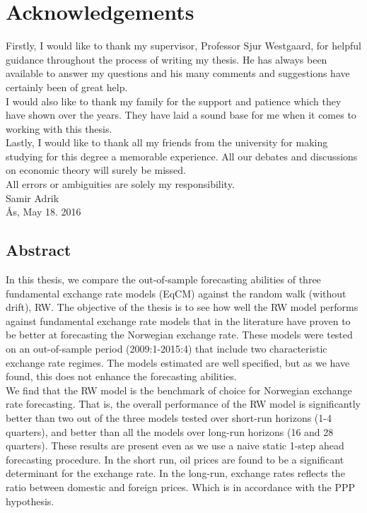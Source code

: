 \documentclass[10pt]{article}
\newcommand\blankpage{%
    \null
    \thispagestyle{empty}%
    \addtocounter{page}{-1}%
    \newpage}
\numberwithin{equation}{section}
\numberwithin{table}{section}
\numberwithin{figure}{section}
\begin{document}
\afterpage{\blankpage}
\newpage
\begin{spacing}{1.5}
\section*{Acknowledgements}

\noindent Firstly, I would like to thank my supervisor, Professor Sjur Westgaard, for helpful guidance throughout the process of writing my thesis. He has always been available to answer my questions and his many comments and suggestions have certainly been of great help.\\

\noindent I would also like to thank my family for the support and patience which they have shown over the years. They have laid a sound base for me when it comes to working with this thesis.\\

\noindent Lastly, I would like to thank all my friends from the university for making studying for this degree a memorable experience. All our debates and discussions on economic theory will surely be missed.\\

\noindent All errors or ambiguities are solely my responsibility.\\

\noindent Samir Adrik\\
Ås, May 18. 2016


\newpage
\afterpage{\blankpage}
\newpage

\vspace*{0,1\textheight}
\begin{center}
\section*{Abstract}
\end{center}

\noindent In this thesis, we compare the out-of-sample forecasting abilities of three fundamental exchange rate models (EqCM) against the random walk (without drift), RW. The objective of the thesis is to see how well the RW model performs against fundamental exchange rate models that in the literature have proven to be better at forecasting the Norwegian exchange rate. These models were tested on an out-of-sample period (2009:1-2015:4) that include two characteristic exchange rate regimes. The models estimated are well specified, but as we have found, this does not enhance the forecasting abilities.\\
\indent We find that the RW model is the benchmark of choice for Norwegian exchange rate forecasting. That is, the overall performance of the RW model is significantly better than two out of the three models tested over short-run horizons (1-4 quarters), and better than all the models over long-run horizons (16 and 28 quarters). These results are present even as we use a naive static 1-step ahead forecasting procedure. In the short run, oil prices are found to be a significant determinant for the exchange rate. In the long-run, exchange rates reflects the ratio between domestic and foreign prices. Which is in accordance with the PPP hypothesis. 
    



\end{spacing}
\end{document}
